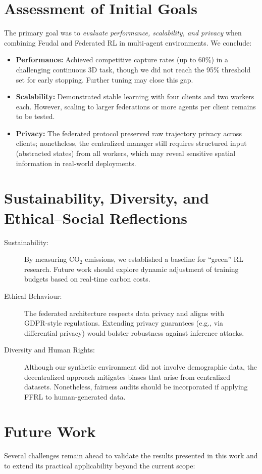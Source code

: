 \documentclass[12pt,a4paper,twoside,openany]{book}
\begin{document}
\section{Assessment of Initial Goals}
The primary goal was to \emph{evaluate performance, scalability, and privacy} when combining Feudal and Federated RL in multi‑agent environments. We conclude:
\begin{itemize}
  \item \textbf{Performance:} Achieved competitive capture rates (up to 60\%) in a challenging continuous 3D task, though we did not reach the 95\% threshold set for early stopping. Further tuning may close this gap.
  \item \textbf{Scalability:} Demonstrated stable learning with four clients and two workers each. However, scaling to larger federations or more agents per client remains to be tested.
  \item \textbf{Privacy:} The federated protocol preserved raw trajectory privacy across clients; nonetheless, the centralized manager still requires structured input (abstracted states) from all workers, which may reveal sensitive spatial information in real‑world deployments.
\end{itemize}

\section{Sustainability, Diversity, and Ethical–Social Reflections}
\begin{description}
  \item[Sustainability:] By measuring CO$_2$ emissions, we established a baseline for ``green'' RL research. Future work should explore dynamic adjustment of training budgets based on real‑time carbon costs.
  \item[Ethical Behaviour:] The federated architecture respects data privacy and aligns with GDPR‑style regulations. Extending privacy guarantees (e.g., via differential privacy) would bolster robustness against inference attacks.
  \item[Diversity and Human Rights:] Although our synthetic environment did not involve demographic data, the decentralized approach mitigates biases that arise from centralized datasets. Nonetheless, fairness audits should be incorporated if applying FFRL to human‑generated data.
\end{description}

\section{Future Work}
Several challenges remain ahead to validate the results presented in this work and to extend its practical applicability beyond the current scope:
\end{document}
